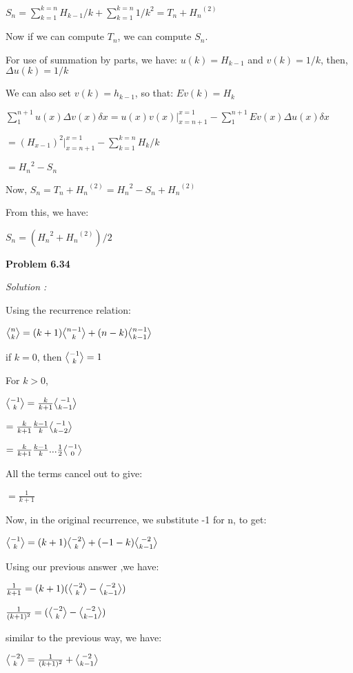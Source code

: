 \documentclass[12pt]{article}
\def \bangle{ \atopwithdelims \langle \rangle}
\begin{document}
$S_n = \sum_{k=1}^{k=n}H_{k-1}/k + \sum_{k=1}^{k=n}{1/k^2} = T_n + {H_n}^{(2)}$

Now if we can compute $T_n$, we can compute $S_n$.

For use of summation by parts, we have: $u(k) = H_{k-1}$ and $v(k)=1/k$, then, $\Delta u(k) = 1/k$

We can also set $v(k) = h_{k-1}$, so that: $Ev(k) = H_k$

$\sum_{1}^{n+1} u(x) \Delta v(x) \delta x = u(x)v(x){\Biggr|_{x=n+1}^{x=1}} - \sum_{1}^{n+1}Ev(x) \Delta u(x) \delta x$

$= (H_{x-1})^2 {\Biggr|_{x=n+1}^{x=1}} - \sum_{k=1}^{k=n}{H_k/k}$

$= {H_n}^2-{S_n}$

Now, $S_n = T_n+{H_n}^(2) = {H_n}^2 - S_n + {H_n}^(2)$

From this, we have:

$S_n = ({H_n}^2+{H_n}^{(2)})/2$

\medskip

\medskip

\noindent
{\bf Problem 6.34}

\textit {Solution :}

Using the recurrence relation:

${n \bangle k} = {(k+1){n-1 \bangle k}}+{(n-k){n-1 \bangle k-1}}$

if $k=0$, then ${-1 \bangle k} = 1$

For $k>0$,

${-1 \bangle k} = {\frac{k}{k+1}}{-1 \bangle k-1}$

$= {\frac{k}{k+1}}{\frac{k-1}{k}}{-1 \bangle k-2}$

$= {\frac{k}{k+1}}{\frac{k-1}{k}}...{\frac{1}{2}}{-1 \bangle 0}$

All the terms cancel out to give:

$=\frac{1}{k+1}$

Now, in the original recurrence, we substitute -1 for n, to get:

${-1 \bangle k} = {(k+1){-2 \bangle k}}+{(-1-k){-2 \bangle k-1}}$

Using our previous answer ,we have:

$\frac{1}{k+1} = (k+1){({-2 \bangle k}-{-2 \bangle k-1})}$

$\frac{1}{(k+1)^2} = {({-2 \bangle k}-{-2 \bangle k-1})}$

similar to the previous way, we have:

${-2 \bangle k} = \frac{1}{(k+1)^2}+{-2 \bangle k-1}$
\end{document}
